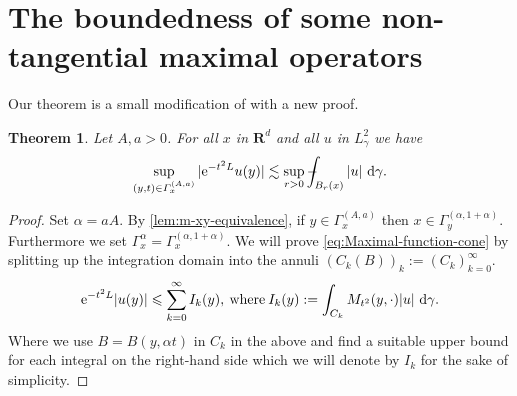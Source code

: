 \documentclass[a4paper,oneside,10pt]{amsproc}
\newtheorem{theorem}{Theorem}
\theoremstyle{remark}
\newcommand{\D}{\,\textup{d}}
\newcommand{\LHG}{{L^2_\gamma}}
\def\Xint#1{\mathchoice
  {\XXint\displaystyle\textstyle{#1}}%
  {\XXint\textstyle\scriptstyle{#1}}%
  {\XXint\scriptstyle\scriptscriptstyle{#1}}%
  {\XXint\scriptscriptstyle\scriptscriptstyle{#1}}%
  \!\int}
\def\XXint#1#2#3{{\setbox0=\hbox{$#1{#2#3}{\int}$ }
    \vcenter{\hbox{$#2#3$ }}\kern-.535\wd0}}
\def\dashint{\Xint-}
\renewcommand{\leq}{\leqslant}
\renewcommand{\leq}{\leqslant}
\newcommand{\R}{\mathbf R}
\newcommand{\e}{\mathrm{e}} %
\renewcommand{\leq}{\leqslant}%
\begin{document}
\section{The boundedness of some non-tangential maximal operators}
Our theorem is a small modification of \cite[lemma 1.1]{Pineda2008} with a new proof.
\begin{theorem}\label{thm:Gaussian-maximal-function}
  Let $A, a > 0$. For all $x$ in $\R^d$ and all $u$ in $\LHG$ we have
  \begin{equation}
    \label{eq:Maximal-function-cone}
    \sup_{(y, t) \in \Gamma_x^{(A, a)}} |\e^{-t^2 L} u(y)| \lesssim
    \sup_{r > 0} \dashint_{B_r(x)} |u| \, \D\gamma.
  \end{equation}
\end{theorem}
\begin{proof}
  Set $\alpha = aA$. By \autoref{lem:m-xy-equivalence}, if $y \in
  \Gamma_x^{(A, a)}$ then $x \in \Gamma_y^{(\alpha, 1 + \alpha)}$.
  Furthermore we set $\Gamma_x^\alpha = \Gamma^{(\alpha, 1 +
    \alpha)}_x$.
  We will prove \eqref{eq:Maximal-function-cone} by splitting up the
  integration domain into the annuli $(C_k(B))_k := (C_k)_{k = 0}^\infty$.
  \begin{equation*}
    \e^{-t^2 L} |u(y)| \leq \sum_{k = 0}^\infty I_k(y),
    \:\text{where}\: I_k(y) := \int_{C_k} M_{t^2}(y, \cdot) |u|
    \,\D\gamma.
  \end{equation*}
  Where we use $B = B(y, \alpha t)$ in $C_k$ in the above and find a
  suitable upper bound for each integral on the right-hand side which
  we will denote by $I_k$ for the sake of simplicity.


\end{proof}
\end{document}

